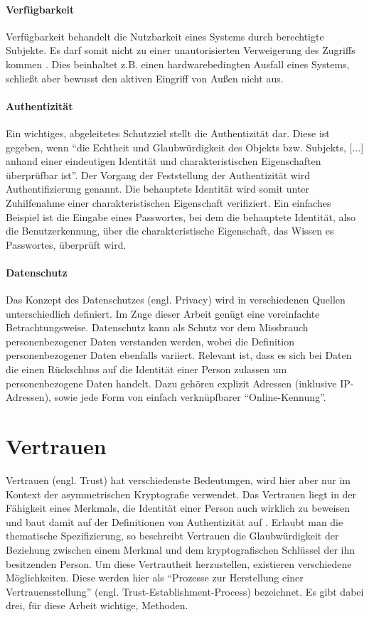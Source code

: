 \paragraph{Verfügbarkeit}
Verfügbarkeit behandelt die Nutzbarkeit eines Systems durch berechtigte Subjekte. Es darf somit nicht zu einer unautorisierten Verweigerung des Zugriffs kommen \cite[p. 12]{Eckert2013}. Dies beinhaltet z.B. einen hardwarebedingten Ausfall eines Systems, schließt aber bewusst den aktiven Eingriff von Außen nicht aus.
 
\paragraph{Authentizität}
Ein wichtiges, abgeleitetes Schutzziel stellt die Authentizität dar. Diese ist gegeben, wenn \enquote{die Echtheit und Glaubwürdigkeit des Objekts bzw. Subjekts, [...] anhand einer eindeutigen Identität und charakteristischen Eigenschaften überprüfbar ist}\cite[p. 8]{Eckert2013}. Der Vorgang der Feststellung der Authentizität wird Authentifizierung genannt. Die behauptete Identität wird somit unter Zuhilfenahme einer charakteristischen Eigenschaft verifiziert. Ein einfaches Beispiel ist die Eingabe eines Passwortes, bei dem die behauptete Identität, also die Benutzerkennung, über die charakteristische Eigenschaft, das Wissen es Passwortes, überprüft wird.  

\paragraph{Datenschutz}
Das Konzept des Datenschutzes (engl. Privacy) wird in verschiedenen Quellen unterschiedlich definiert. Im Zuge dieser Arbeit genügt eine vereinfachte Betrachtungsweise. Datenschutz kann als Schutz vor dem Missbrauch personenbezogener Daten verstanden werden, wobei die Definition personenbezogener Daten ebenfalls variiert. Relevant ist, dass es sich bei Daten die einen Rückschluss auf die Identität einer Person zulassen um personenbezogene Daten handelt. Dazu gehören explizit Adressen (inklusive IP-Adressen), sowie jede Form von einfach verknüpfbarer ``Online-Kennung''\cite{Schwenke2018}.     

\section{Vertrauen}
\label{sec:trust}
Vertrauen (engl. Trust) hat verschiedenste Bedeutungen, wird hier aber nur im Kontext der asymmetrischen Kryptografie verwendet. Das Vertrauen liegt in der Fähigkeit eines Merkmals, die Identität einer Person auch wirklich zu beweisen und baut damit auf der Definitionen von Authentizität auf \cite{Perrin2010}. Erlaubt man die thematische Spezifizierung, so beschreibt Vertrauen die Glaubwürdigkeit der Beziehung zwischen einem Merkmal und dem kryptografischen Schlüssel der ihn besitzenden Person. Um diese Vertrautheit herzustellen, existieren verschiedene Möglichkeiten. Diese werden hier als ``Prozesse zur Herstellung einer Vertrauensstellung'' (engl. Trust-Establishment-Process) bezeichnet. Es gibt dabei drei, für diese Arbeit wichtige, Methoden.

